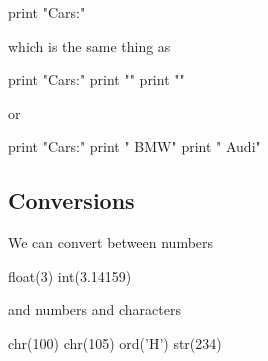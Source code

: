 \begin{fullwidth}
\begin{pyconsole}
print "Cars:\n\tBMW\n\tAudi"
\end{pyconsole}

which is the same thing as
 
\begin{pyconsole}
print "Cars:"
print "\tBMW"
print "\tAudi"
\end{pyconsole}

or

\begin{pyconsole}
print "Cars:"
print "	BMW"
print "	Audi"
\end{pyconsole}


\subsection{Conversions}

We can convert between numbers

\begin{pyconsole}
float(3)
int(3.14159)
\end{pyconsole}

and numbers and characters

\begin{pyconsole}
chr(100)
chr(105)
ord('H')
str(234)
\end{pyconsole}

\end{fullwidth}